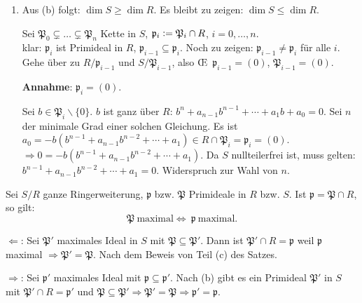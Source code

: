\documentclass[a4paper, 10pt]{report}
\begin{document}
\begin{Bew}
\begin{enumerate}
\item Aus (b) folgt: $\dim{S} \geq\dim{R}$. Es bleibt zu
zeigen: $\dim{S} \leq \dim{R}$.

Sei $\mathfrak{P}_0\subsetneq \ldots \subsetneq \mathfrak{P}_n$ Kette in $S$, 
$\mathfrak{p}_i\mathrel{\mathop:}= \mathfrak{P}_i\cap R$, $i=0,\ldots,n$.\\
klar: $\mathfrak{p}_i$ ist Primideal in $R$, $\mathfrak{p}_{i-1}\subseteq \mathfrak{p}_i$.
Noch zu zeigen: $\mathfrak{p}_{i-1}\neq \mathfrak{p}_i$ f\"ur alle $i$. Gehe \"uber zu
$R/\mathfrak{p}_{i-1}$ und $S/\mathfrak{P}_{i-1}$, also \OE\ $\mathfrak{p}_{i-1}=(0)$,
$\mathfrak{P}_{i-1}=(0)$.

\textbf{Annahme}: $\mathfrak{p}_i=(0)$.

Sei $b\in \mathfrak{P}_{i}\backslash \{0\}$. $b$ ist ganz \"uber $R$: $b^n+a_{n-1}b^{n-1}+\cdots+a_1b+a_0=0$. Sei $n$ der minimale Grad einer solchen Gleichung.
Es ist $a_0=-b(b^{n-1}+a_{n-1}b^{n-2}+\cdots+a_1)\in R\cap \mathfrak{P}_i=\mathfrak{p}_i=(0)$.
$\Rightarrow 0=-b(b^{n-1}+a_{n-1}b^{n-2}+\cdots+a_1)$.
Da $S$ nullteilerfrei ist, muss gelten: $b^{n-1}+a_{n-1}b^{n-2}+\cdots+a_1=0$. Widerspruch zur
Wahl von $n$.
\end{enumerate}
\end{Bew}

\begin{Folg}
\label{2.26}
Sei $S/R$ ganze Ringerweiterung, $\mathfrak{p}$ bzw. $\mathfrak{P}$ Primideale in $R$ bzw. $S$.
Ist $\mathfrak{p}=\mathfrak{P}\cap R$, so gilt:
\[
\mathfrak{P}\ \text{maximal} \Leftrightarrow\ \mathfrak{p}\ \text{maximal}.
\]
\end{Folg}

\begin{Bew}
\glqq$\Leftarrow$\grqq: Sei $\mathfrak{P}'$ maximales Ideal in $S$ mit 
$\mathfrak{P}\subseteq \mathfrak P'$. Dann ist $\mathfrak{P}'\cap R=\mathfrak{p}$ weil
$\mathfrak{p}$ maximal $\Rightarrow\mathfrak{P'}=\mathfrak{P}$. Nach dem Beweis
von Teil (c) des Satzes.

\glqq$\Rightarrow$\grqq: Sei $\mathfrak{p}'$ maximales Ideal mit $\mathfrak{p}\subseteq \mathfrak{p'}$.
Nach (b) gibt es ein Primideal $\mathfrak{P}'$ in $S$ mit $\mathfrak{P}'\cap R=\mathfrak{p}'$
und $\mathfrak{P}\subseteq \mathfrak{P}'\Rightarrow \mathfrak{P'}=\mathfrak{P}\Rightarrow
\mathfrak{p}'=\mathfrak{p}$.

\end{Bew}
\end{document}

